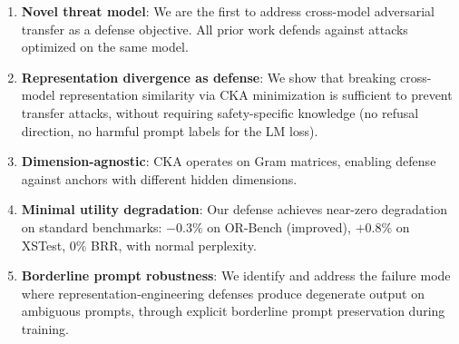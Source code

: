 \documentclass[11pt]{article}
\begin{document}
\begin{enumerate}
    \item \textbf{Novel threat model}: We are the first to address cross-model adversarial transfer as a defense objective. All prior work defends against attacks optimized on the same model.

    \item \textbf{Representation divergence as defense}: We show that breaking cross-model representation similarity via CKA minimization is sufficient to prevent transfer attacks, without requiring safety-specific knowledge (no refusal direction, no harmful prompt labels for the LM loss).

    \item \textbf{Dimension-agnostic}: CKA operates on Gram matrices, enabling defense against anchors with different hidden dimensions.

    \item \textbf{Minimal utility degradation}: Our defense achieves near-zero degradation on standard benchmarks: $-0.3\%$ on OR-Bench (improved), $+0.8\%$ on XSTest, $0\%$ BRR, with normal perplexity.

    \item \textbf{Borderline prompt robustness}: We identify and address the failure mode where representation-engineering defenses produce degenerate output on ambiguous prompts, through explicit borderline prompt preservation during training.
\end{enumerate}
\end{document}
